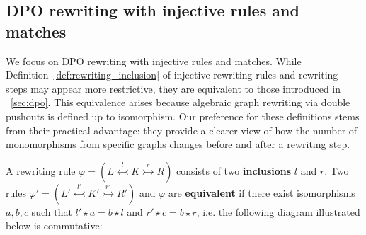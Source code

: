 \subsection{DPO rewriting with injective rules and matches} 
We focus on DPO rewriting with injective rules and matches. While Definition~\ref{def:rewriting_inclusion} of injective rewriting rules and rewriting steps may appear more restrictive, they are equivalent to those introduced in \textsection~\ref{sec:dpo}. This equivalence arises because algebraic graph rewriting via double pushouts is defined up to isomorphism. Our preference for these definitions stems from their practical advantage: they provide a clearer view of how the number of monomorphisms from specific graphs changes before and after a rewriting step.
 
\begin{definition}
    \label{def:rewriting_inclusion}
    A rewriting rule $\varphi = (L \overset{l}{\leftarrowtail} K \overset{r}{\rightarrowtail} R)$ consists of two \textbf{inclusions} $l$ and $r$.  
    Two rules $\varphi' = (L' \overset{l'}{\leftarrowtail} K' \overset{r'}{\rightarrowtail} R')$ and $\varphi$ are \textbf{equivalent} if there exist isomorphisms $a,b,c$ such that 
    $l' \star a = b \star l$ and $r' \star c = b \star r$, i.e. the following diagram illustrated below is commutative:    
            \begin{center}
\end{center}
\end{definition}
